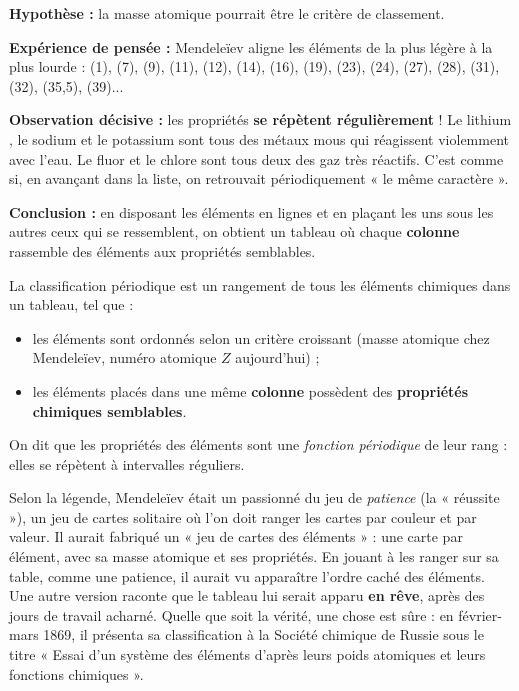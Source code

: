 \documentclass[11pt]{article}
\newcommand{\cle}[1]{{\popxbold\color{popdark}#1}}
\begin{document}
\begin{experience}
\textbf{Hypothèse :} la masse atomique pourrait être le critère de classement.

\textbf{Expérience de pensée :} Mendeleïev aligne les éléments de la plus légère à la plus lourde :  (1),  (7),  (9),  (11),  (12),  (14),  (16),  (19),  (23),  (24),  (27),  (28),  (31),  (32),  (35,5),  (39)...

\textbf{Observation décisive :} les propriétés \textbf{se répètent régulièrement} ! Le lithium , le sodium  et le potassium  sont tous des métaux mous qui réagissent violemment avec l'eau. Le fluor  et le chlore  sont tous deux des gaz très réactifs. C'est comme si, en avançant dans la liste, on retrouvait périodiquement « le même caractère ».

\textbf{Conclusion :} en disposant les éléments en lignes et en plaçant les uns sous les autres ceux qui se ressemblent, on obtient un tableau où chaque \textbf{colonne} rassemble des éléments aux propriétés semblables.
\end{experience}

\begin{definition}
La \cle{classification périodique} est un rangement de tous les éléments chimiques dans un tableau, tel que :
\begin{itemize}
\item les éléments sont ordonnés selon un critère croissant (masse atomique chez Mendeleïev, numéro atomique $Z$ aujourd'hui) ;
\item les éléments placés dans une même \textbf{colonne} possèdent des \textbf{propriétés chimiques semblables}.
\end{itemize}
On dit que les propriétés des éléments sont une \emph{fonction périodique} de leur rang : elles se répètent à intervalles réguliers.
\end{definition}

\begin{savaistu}
Selon la légende, Mendeleïev était un passionné du jeu de \emph{patience} (la « réussite »), un jeu de cartes solitaire où l'on doit ranger les cartes par couleur et par valeur. Il aurait fabriqué un « jeu de cartes des éléments » : une carte par élément, avec sa masse atomique et ses propriétés. En jouant à les ranger sur sa table, comme une patience, il aurait vu apparaître l'ordre caché des éléments. Une autre version raconte que le tableau lui serait apparu \textbf{en rêve}, après des jours de travail acharné. Quelle que soit la vérité, une chose est sûre : en février-mars 1869, il présenta sa classification à la Société chimique de Russie sous le titre « Essai d'un système des éléments d'après leurs poids atomiques et leurs fonctions chimiques ».
\end{savaistu}
\end{document}
